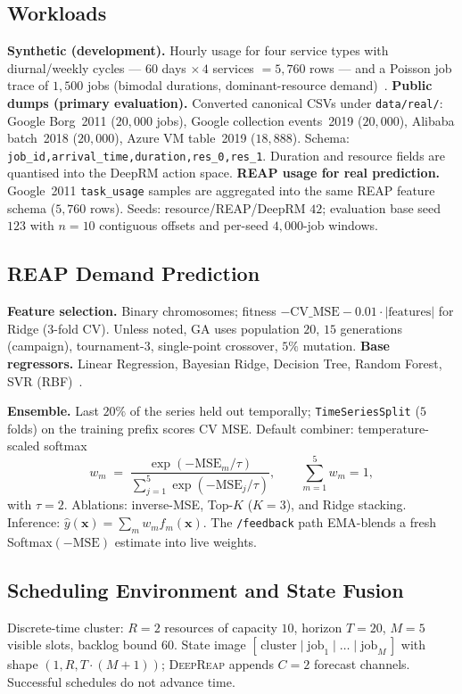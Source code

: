 \documentclass[runningheads]{llncs}
\newcommand{\deepreap}{\textsc{DeepReap}}
\begin{document}
\subsection{Workloads}\label{sec:data}
\textbf{Synthetic (development).} Hourly usage for four service types
with diurnal/weekly cycles --- $60$ days $\times\,4$ services
$=5{,}760$ rows --- and a Poisson job trace of $1{,}500$ jobs
(bimodal durations, dominant-resource demand)~\cite{mao2016}.
\textbf{Public dumps (primary evaluation).} Converted canonical CSVs
under \texttt{data/real/}: Google Borg~2011 ($20{,}000$ jobs), Google
collection events~2019 ($20{,}000$), Alibaba batch~2018 ($20{,}000$),
Azure VM table~2019 ($18{,}888$). Schema:
\texttt{job\_id,arrival\_time,duration,res\_0,res\_1}. Duration and
resource fields are quantised into the DeepRM action space.
\textbf{REAP usage for real prediction.} Google~2011
\texttt{task\_usage} samples are aggregated into the same REAP feature
schema ($5{,}760$ rows). Seeds: resource/REAP/DeepRM $42$; evaluation
base seed $123$ with $n{=}10$ contiguous offsets and per-seed
$4{,}000$-job windows.

\subsection{REAP Demand Prediction}\label{sec:reap}
\textbf{Feature selection.} Binary chromosomes; fitness
$-\mathrm{CV\_MSE}-0.01\cdot|\text{features}|$ for Ridge ($3$-fold CV).
Unless noted, GA uses population $20$, $15$ generations (campaign),
tournament-$3$, single-point crossover, $5\%$ mutation.
\textbf{Base regressors.} Linear Regression, Bayesian Ridge, Decision
Tree, Random Forest, SVR (RBF)~\cite{kaur2019}.

\textbf{Ensemble.} Last $20\%$ of the series held out temporally;
\texttt{TimeSeriesSplit} ($5$ folds) on the training prefix scores CV
MSE. Default combiner: temperature-scaled softmax
\begin{equation}
w_m \;=\; \frac{\exp(-\mathrm{MSE}_m/\tau)}{\sum_{j=1}^{5}
\exp(-\mathrm{MSE}_j/\tau)},
\qquad \sum_{m=1}^{5} w_m = 1,
\label{eq:weights}
\end{equation}
with $\tau{=}2$. Ablations: inverse-MSE, Top-$K$ ($K{=}3$), and Ridge
stacking. Inference:
$\hat{y}(\mathbf{x})=\sum_m w_m f_m(\mathbf{x})$. The
\texttt{/feedback} path EMA-blends a fresh Softmax$(-\mathrm{MSE})$
estimate into live weights.

\subsection{Scheduling Environment and State Fusion}\label{sec:env}
Discrete-time cluster: $R{=}2$ resources of capacity $10$, horizon
$T{=}20$, $M{=}5$ visible slots, backlog bound $60$. State image
$[\,\text{cluster}\mid\text{job}_1\mid\dots\mid\text{job}_M\,]$ with
shape $(1,R,T\cdot(M{+}1))$; \deepreap{} appends $C{=}2$ forecast
channels. Successful schedules do not advance time.
\end{document}
